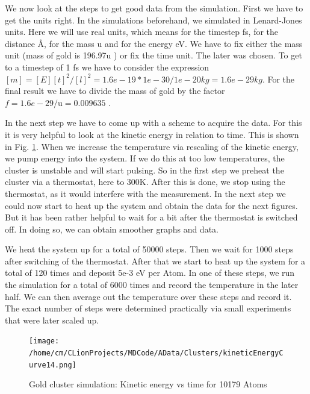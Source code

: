 \par 
We now look at the steps to get good data from the simulation. 
First we have to get the units right. In the simulations beforehand, we simulated in Lenard-Jones units. Here we will use real units, which means for the timestep fs, for the distance \r{A}, for the mass u and for the energy eV. We have to fix either the mass unit (mass of gold is 196.97u \cite{Kurzweil2015}) or fix the time unit. The later was chosen. To get to a timestep of 1 fs we have to consider the expression $ [m] = [E][t]^2/[l]^2 = 1.6e-19 * 1e-30/1e-20 kg = 1.6e-29kg $. For the final result we have to divide the mass of gold by the factor $ f = 1.6e-29/\mathrm{u} = 0.009635 $
\cite{molDymCourse}.

In the next step we have to come up with a scheme to acquire the data. For this it is very helpful to look at the kinetic energy in relation to time. This is shown in Fig. \ref{GoldClusterSimulationKinVsTime}. When we increase the temperature via rescaling of the kinetic energy, we pump energy into the system. If we do this at too low temperatures, the cluster is unstable and will start pulsing. 
So in the first step we preheat the cluster via a thermostat, here to 300K. After this is done, we stop using the thermostat, as it would interfere with the measurement. In the next step we could now start to heat up the system and obtain the data for the next figures. But it has been rather helpful to wait for a bit after the thermostat is switched off. In doing so, we can obtain smoother graphs and data. 
\par
We heat the system up for a total of 50000 steps. Then we wait for 1000 steps after switching of the thermostat. After that we start to heat up the system for a total of 120 times and deposit 5e-3 eV per Atom. In one of these steps, we run the simulation for a total of 6000 times and record the temperature in the later half. We can then average out the temperature over these steps and record it. The exact number of steps were determined practically via small experiments that were later scaled up. 
\begin{figure}
	\begin{center} 
		\texttt{[image: /home/cm/CLionProjects/MDCode/AData/Clusters/kineticEnergyCurve14.png]} 
	\end{center} 
	\caption[Gold cluster simulation: Kinetic Energy vs Time]{Gold cluster simulation: Kinetic energy vs time for 10179 Atoms} 
	\label{GoldClusterSimulationKinVsTime} 
\end{figure} 


